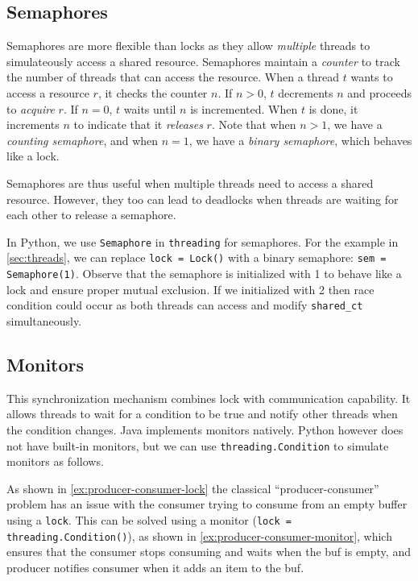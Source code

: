 \documentclass[oneside,11pt,dvipsnames]{book}
\newcommand{\code}[1]{\texttt{#1}}
\begin{document}
\subsection{Semaphores}\label{sec:semaphores}

Semaphores are more flexible than locks as they allow \emph{multiple} threads to simulateously access a shared resource.  Semaphores maintain a \emph{counter} to track the number of threads that can access the resource.  When a thread $t$ wants to access a resource $r$, it checks the counter $n$. If $n > 0$, $t$ decrements $n$ and proceeds to \emph{acquire} $r$. If $n=0$, $t$ waits until $n$ is incremented. When $t$ is done, it increments $n$ to indicate that it \emph{releases} $r$. Note that when $n>1$, we have a \emph{counting semaphore}, and when $n=1$, we have a \emph{binary semaphore}, which behaves like a lock.

Semaphores are thus useful when multiple threads need to  access a shared resource. However, they too can lead to deadlocks when threads are waiting for each other to release a semaphore.

In Python, we use \code{Semaphore} in \code{threading} for semaphores. For the example in \autoref{sec:threads}, we can replace \code{lock = Lock()} with a binary semaphore: \code{sem = Semaphore(1)}. Observe that the semaphore is initialized with 1 to behave like a lock and ensure proper mutual exclusion. If we initialized with 2 then race condition could occur as both threads can access and modify \code{shared\_ct} simultaneously.


\subsection{Monitors}\label{sec:monitors}

This synchronization mechanism combines lock with communication capability.  It allows threads to wait for a condition to be true and notify other threads when the condition changes. Java implements monitors natively. Python however does not have built-in monitors, but we can use \code{threading.Condition} to simulate monitors as follows. 

As shown in \autoref{ex:producer-consumer-lock} the classical ``producer-consumer'' problem has an issue with the consumer trying to consume from an empty buffer using a \code{lock}. This can be solved using a monitor (\code{lock = threading.Condition()}), as shown in \autoref{ex:producer-consumer-monitor}, which ensures that the consumer stops consuming and waits when the buf is empty, and producer notifies consumer when it adds an item to the buf.
\end{document}
